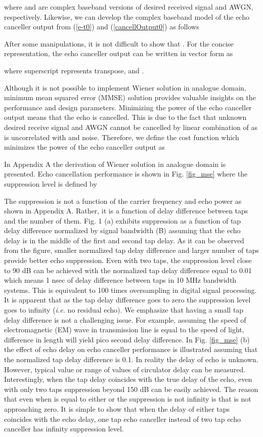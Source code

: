 \documentclass[twocolumn]{IEEEtran}
\begin{document}
where  and  are complex baseband versions of desired
received signal and AWGN, respectively. Likewise, we can develop the
complex baseband model of the echo canceller output from
(\ref{e-t0}) and (\ref{cancellOutput0}) as follows


After some manipulations, it is not difficult to show that
. For the concise representation, the echo
canceller output can be written in vector form as


where superscript  represents transpose,
 and .

Although it is not possible to implement Wiener solution in analogue
domain, minimum mean squared error (MMSE) solution provides valuable
insights on the performance and design parameters. Minimizing the
power of the echo canceller output means that the echo is cancelled.
This is due to the fact that unknown desired receive signal 
and AWGN cannot be cancelled by linear combination of
 as  is uncorrelated with 
and noise. Therefore, we define the cost function which minimizes
the power of the echo canceller output as


In Appendix A the derivation of Wiener solution in analogue domain
is presented. Echo cancellation performance is shown in Fig.
\ref{fig_mse} where the suppression level is defined by



\noindent The suppression is not a function of the carrier frequency
and echo power as shown in Appendix A. Rather, it is a function of
delay difference between taps and the number of them. Fig. 1 (a)
exhibits suppression as a function of tap delay difference
normalized by signal bandwidth (B) assuming that the echo delay is
in the middle of the first and second tap delay. As it can be
observed from the figure, smaller normalized tap delay difference
 and larger number of taps provide
better echo suppression. Even with two taps, the suppression level
close to 90 dB can be achieved with the normalized tap delay
difference equal to 0.01 which means 1 nsec of delay difference
between taps in 10 MHz bandwidth systems. This is equivalent to 100
times oversampling in digital signal processing. It is apparent that
as the tap delay difference goes to zero the suppression level goes
to infinity (\emph{i.e.} no residual echo). We emphasize that having
a small tap delay difference is not a challenging issue. For
example, assuming the speed of electromagnetic (EM) wave in
transmission line is equal to the speed of light,  difference
in length will yield  pico second delay difference. In Fig.
\ref{fig_mse} (b) the effect of echo delay on echo canceller
performance is illustrated assuming that the normalized tap delay
difference is 0.1. In reality the delay of echo is unknown. However,
typical value or range of values of circulator delay can be
measured. Interestingly, when the tap delay coincides with the true
delay of the echo, even with only two taps suppression beyond 150 dB
can be easily achieved. The reason that even when  is equal to
either  or  the suppression is not infinity is that
 is not approaching zero. It is simple to show that
when the delay of either taps coincides with the echo delay, one tap
echo canceller instead of two tap echo canceller has infinity
suppression level.
\end{document}

